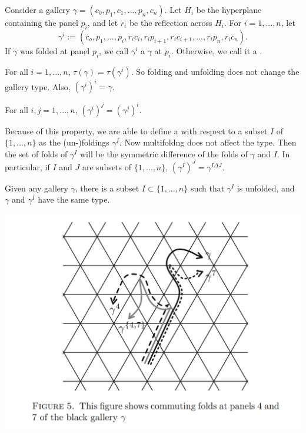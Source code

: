 \documentclass[11pt]{article}
\begin{document}
\begin{definition}
    Consider a gallery $\gamma = (c_0,p_1,c_1,...,p_n,c_n)$. Let $H_i$ be the hyperplane containing the panel $p_i$, and let $r_i$ be the reflection across $H_i$. For $i=1,...,n$, let
    \[\gamma^i:=(c_o,p_1,...,p_i,r_ic_i,r_ip_{i+1},r_ic_{i+1},...,r_ip_n,r_ic_n).\]
    If $\gamma$ was folded at panel $p_i$, we call $\gamma^i$ a $\gamma$ at $p_i$. Otherwise, we call it a .
\end{definition}

\begin{lemma}
    For all $i=1,...,n$, $\tau(\gamma)=\tau(\gamma^i)$. So folding and unfolding does not change the gallery type. Also, $(\gamma^i)^i=\gamma$.
\end{lemma}

\begin{lemma}
    For all $i,j=1,...,n$, $(\gamma^i)^j=(\gamma^j)^i.$
\end{lemma}

Because of this property, we are able to define a  with respect to a subset $I$ of $\{1,...,n\}$ as the (un-)foldings $\gamma^I$. Now multifoldng does not affect the type. Then the set of folds of $\gamma^I$ will be the symmetric difference of the folds of $\gamma$ and $I$. In particular, if $I$ and $J$ are subsets of $\{1,...,n\}$, $(\gamma^I)^J=\gamma^{I\Delta J}$. 

\begin{corollary}
    Given any gallery $\gamma$, there is a subset $I\subset \{1,...,n\}$ such that $\gamma^I$ is unfolded, and $\gamma$ and $\gamma^I$ have the same type.
\end{corollary}


\includegraphics[scale=0.6]{Screenshot 2023-02-03 153412.png}\\
\end{document}
